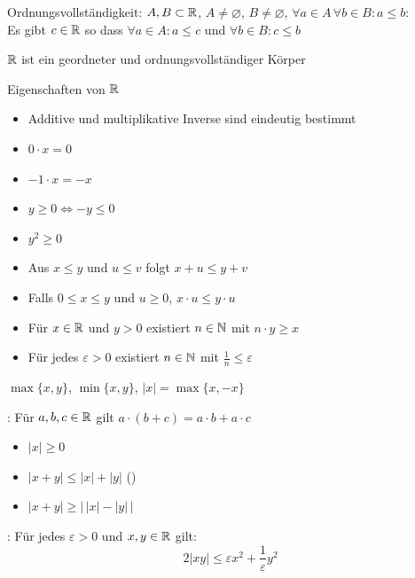 \Satz Ordnungsvollständigkeit: $A, B \subset \mathbb{R}$, $A\ne \varnothing$, $B\ne \varnothing$,
$\forall a \in A \, \forall b \in B : a\le b$: \\
Es gibt $c \in \mathbb{R}$ so dass $\forall a \in A : a\le c$ und $\forall b \in B : c\le b$

\Satz $\mathbb{R}$ ist ein geordneter und ordnungsvollständiger Körper

\Kor Eigenschaften von $\mathbb{R}$
\vspace{-0.6em}
\begin{itemize}
    \item Additive und multiplikative Inverse sind eindeutig bestimmt
    \item $0 \cdot x = 0$
    \item $-1 \cdot x = -x$
    \item $y\ge 0 \iff -y\le 0$
    \item $y^2\ge 0$
    \item Aus $x\le y$ und $u\le v$ folgt $x + u\le y + v$
    \item Falls $0\le x\le y$ und $u\ge 0$, $x \cdot u\le y \cdot u$
\end{itemize}

\Kor {}
\vspace{-0.6em}
\begin{itemize}
    \item Für $x \in \mathbb{R}$ und $y > 0$ existiert $n \in \mathbb{N}$ mit $n \cdot y\ge x$
    \item Für jedes $\varepsilon > 0$ existiert $n \in \mathbb{N}$ mit $\frac{1}{n}\le \varepsilon$
\end{itemize}

\Def $\max\{x, y\}$, $\min\{x, y\}$,  $|x| = \max\{x, -x\}$

\Satz {}: Für $a, b, c \in \mathbb{R}$ gilt $a \cdot (b + c) = a \cdot b + a \cdot c$

\Satz {}
\vspace{-0.6em}
\begin{itemize}
    \item $|x|\ge 0$
    \item $|x + y|\le |x| + |y|$ ()
    \item $|x + y|\ge \bigl| \, |x| - |y| \, \bigr|$
\end{itemize}

\Satz {}: Für jedes $\varepsilon > 0$ und $x, y \in \mathbb{R}$ gilt:
$$2|xy|\le \varepsilon x^2 + \frac{1}{\varepsilon}y^2$$

